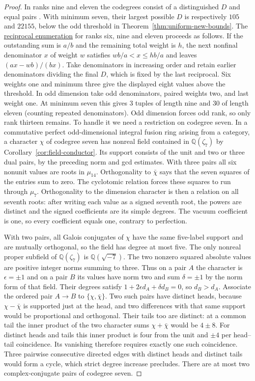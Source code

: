 \documentclass[11pt,a4paper]{article}
\numberwithin{equation}{section}
\theoremstyle{remark}
\newcommand{\QQ}{\mathbb Q}
\begin{document}
\begin{proof}
In ranks nine and eleven the codegrees consist of a distinguished $D$
and equal pairs \cite[Proposition~8.5]{ABDPIntegral}. With minimum
seven, their largest possible $D$ is respectively $105$ and $22155$,
below the odd threshold in Theorem~\ref{thm:uniform-new-bounds}.
The \href{https://github.com/sebastienpalcoux/WGT-fusion-categories/blob/main/code/verify_small_ranks.py}{reciprocal enumeration} for ranks six, nine and eleven proceeds as follows.
If the outstanding sum is $a/b$ and the remaining total weight is $h$,
the next nonfinal denominator $x$ of weight $w$ satisfies
$wb/a<x\le hb/a$ and leaves $(ax-wb)/(bx)$. Take denominators in
increasing order and retain earlier denominators dividing the final
$D$, which is fixed by the last reciprocal. Six weights one and
minimum three give the displayed eight values above the threshold.
In odd dimension take odd denominators, paired weights two, and
last weight one. At minimum seven this gives $3$ tuples of length
nine and $30$ of length eleven (counting repeated denominators).
Odd dimension forces odd rank, so only rank thirteen remains. To handle it we need a restriction on codegree seven. In a commutative
perfect odd-dimensional integral fusion ring arising from a category,
a character $\chi$ of codegree seven has nonreal field contained in
$\QQ(\zeta_7)$ by Corollary~\ref{cor:field-conductor}.
Its support consists of the unit and two or three dual pairs, by the
preceding norm and gcd estimates. With three pairs all six nonunit
values are roots in $\mu_{14}$. Orthogonality to $\bar\chi$ says
that the seven squares of the entries sum to zero. The cyclotomic
relation forces these squares to run through $\mu_7$. Orthogonality
to the dimension character is then a relation on all seventh roots:
after writing each value as a signed seventh root, the powers
are distinct and the signed coefficients are its simple degrees.
The vacuum coefficient is one, so every coefficient equals one,
contrary to perfection.

With two pairs, all Galois conjugates of $\chi$ have the same
five-label support and are mutually orthogonal, so the field has
degree at most five. The only nonreal proper subfield of
$\QQ(\zeta_7)$ is $\QQ(\sqrt{-7})$. The two nonzero squared absolute
values are positive integer norms summing to three. Thus on a pair
$A$ the character is $\epsilon=\pm1$ and on a pair $B$ its values
have norm two and sum $\delta=\pm1$ by the norm form of that field.
Their degrees satisfy $1+2\epsilon d_A+\delta d_B=0$, so
$d_B>d_A$. Associate the ordered pair $A\to B$ to
$\{\chi,\bar\chi\}$. Two such pairs have distinct heads, because
$\chi-\bar\chi$ is supported just at the head, and two differences
with that same support would be proportional and orthogonal. Their
tails too are distinct: at a common tail the inner product of the
two character sums $\chi+\bar\chi$ would be $4\pm8$. For distinct
heads and tails this inner product is four from the unit and $\pm4$
per head--tail coincidence. Its vanishing therefore requires
exactly one such coincidence. Three pairwise consecutive directed
edges with distinct heads and distinct tails would form a cycle,
which strict degree increase precludes. There are at most two
complex-conjugate pairs of codegree seven.


\end{proof}
\end{document}
